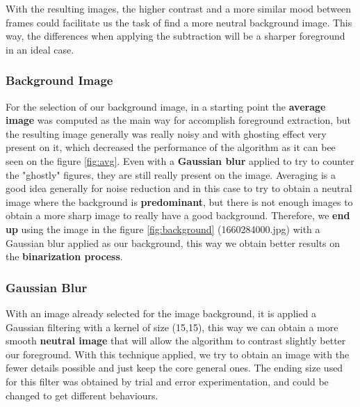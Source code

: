 \documentclass[10pt]{article}
\begin{document}
With the resulting images, the higher contrast and a more similar mood between frames could facilitate us the task of find a more neutral background image. This way, the differences  when applying the subtraction will be a sharper foreground in an ideal case. 

\FloatBarrier
\subsubsection*{Background Image}

For the selection of our background image, in a starting point the \textbf{average image} was computed as the main way for accomplish foreground extraction, but the resulting image generally was really noisy and with ghosting effect very present on it, which decreased the performance of the algorithm as it can bee seen on the figure \ref{fig:avg}. Even with a \textbf{Gaussian blur} applied to try to counter the "ghostly" figures, they are still really present on the image. Averaging is a good idea generally for noise reduction and in this case to try to obtain a neutral image where the background is \textbf{predominant}, but there is not enough images to obtain a more sharp image to really have a good background. Therefore, we \textbf{end up} using the image in the figure \ref{fig:background} (1660284000.jpg)  with a Gaussian blur applied as our background, this way we obtain better results on the \textbf{binarization process}.




\subsubsection*{Gaussian Blur}
With an image already selected for the image background, it is applied a Gaussian filtering with a kernel of size (15,15), this way  we can obtain a more smooth \textbf{neutral image} that will allow the algorithm to contrast slightly better our foreground. With this technique applied, we try to obtain an image with the fewer details possible and just keep the core general ones. The ending size used for this filter was obtained by trial and error experimentation, and could be changed to get different behaviours.
\end{document}

